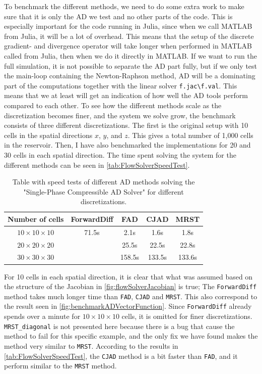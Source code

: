 To benchmark the different methods, we need to do some extra work to make sure that it is only the AD we test and no other parts of the code. This is especially important for the code running in Julia, since when we call MATLAB from Julia, it will be a lot of overhead. This means that the setup of the discrete gradient- and divergence operator will take longer when performed in MATLAB called from Julia, then when we do it directly in MATLAB. If we want to run the full simulation, it is not possible to separate the AD part fully, but if we only test the main-loop containing the Newton-Raphson method, AD will be a dominating part of the computations together with the linear solver \texttt{f.jac\textbackslash f.val}. This means that we at least will get an indication of how well the AD tools perform compared to each other. To see how the different methods scale as the discretization becomes finer, and the system we solve grow, the benchmark consists of three different discretizations. The first is the original setup with 10 cells in the spatial directions $x$, $y$, and $z$. This gives a total number of 1,000 cells in the reservoir. Then, I have also benchmarked the implementations for 20 and 30 cells in each spatial direction. The time spent solving the system for the different methods can be seen in \autoref{tab:FlowSolverSpeedTest}.
\begin{table}[H]
    \centering
    \caption{Table with speed tests of different AD methods solving the "Single-Phase Compressible AD Solver" for different discretizations.}
    \label{tab:FlowSolverSpeedTest}
    \def\arraystretch{1.5}
    \begin{tabular}{ccccc}
    \textbf{Number of cells} & \textbf{ForwardDiff} & \textbf{FAD} & \textbf{CJAD} & \textbf{MRST}\\
        \hline
         $10\times10\times10$ & 71.5s & 2.1s & 1.6s & 1.8s  \\  
         $20\times20\times20$ & ~ & 25.5s & 22.5s & 22.8s \\ 
         $30\times30\times30$ & ~ & 158.5s & 133.5s & 133.6s \\ \hline
    \end{tabular}
\end{table}
For 10 cells in each spatial direction, it is clear that what was assumed based on the structure of the Jacobian in \autoref{fig:flowSolverJacobian} is true; The  \texttt{ForwardDiff} method takes much longer time than  \texttt{FAD}, \texttt{CJAD} and \texttt{MRST}. This also correspond to the result seen in \autoref{fig:benchmarkADVectorFunction}. Since \texttt{ForwardDiff} already spends over a minute for $10\times 10\times 10$ cells, it is omitted for finer discretizations. \texttt{MRST\_diagonal} is not presented here because there is a bug that cause the method to fail for this specific example, and the only fix we have found makes the method very similar to \texttt{MRST}. According to the results in \autoref{tab:FlowSolverSpeedTest}, the \texttt{CJAD} method is a bit faster than  \texttt{FAD}, and it perform similar to the \texttt{MRST} method. 


